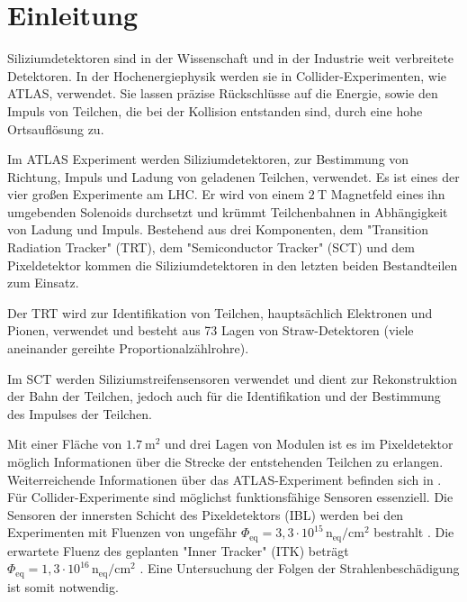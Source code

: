 \chapter{Einleitung}
Siliziumdetektoren sind in der Wissenschaft und in der Industrie weit verbreitete
Detektoren. In der Hochenergiephysik werden sie in Collider-Experimenten, wie ATLAS, verwendet.
Sie  lassen präzise Rückschlüsse auf die Energie, sowie den Impuls von Teilchen, die bei der
Kollision entstanden sind, durch eine
hohe Ortsauflösung zu.


Im ATLAS Experiment werden Siliziumdetektoren, zur Bestimmung von Richtung, Impuls
und Ladung von geladenen Teilchen, verwendet. Es ist eines der vier großen Experimente am LHC.
Er wird von einem $\SI{2}{\tesla}$ Magnetfeld eines ihn umgebenden Solenoids
durchsetzt und krümmt Teilchenbahnen in Abhängigkeit von Ladung und Impuls.
Bestehend aus drei Komponenten, dem "Transition Radiation Tracker" (TRT), dem "Semiconductor Tracker" (SCT) und
dem Pixeldetektor kommen  die
Siliziumdetektoren in den letzten beiden Bestandteilen zum Einsatz.

Der TRT wird zur Identifikation von Teilchen, hauptsächlich Elektronen und Pionen, verwendet und besteht aus 73 Lagen
von Straw-Detektoren (viele aneinander gereihte Proportionalzählrohre).

Im SCT werden Siliziumstreifensensoren verwendet und dient zur
Rekonstruktion der Bahn der Teilchen, jedoch auch für die Identifikation und der Bestimmung des Impulses der Teilchen.

Mit einer Fläche von $\SI{1.7}{\meter\squared}$ und drei Lagen von Modulen
ist es im Pixeldetektor möglich
Informationen über die Strecke der entstehenden Teilchen zu erlangen.
Weiterreichende Informationen über das ATLAS-Experiment befinden sich in \cite{ATLAS}.
Für Collider-Experimente sind möglichst funktionsfähige Sensoren essenziell.
Die Sensoren der innersten Schicht des Pixeldetektors (IBL)
werden bei den Experimenten mit Fluenzen von ungefähr $\Phi_{\mathrm{eq}} =3,3\cdot 10^{15} \, \mathrm{n_{eq}/cm^2}$ bestrahlt \cite{Capeans:1291633}.
Die erwartete Fluenz des geplanten "Inner Tracker" (ITK) beträgt
$\Phi_{\mathrm{eq}} =1,3\cdot 10^{16} \, \mathrm{n_{eq}/cm^2}$ \cite{itk}. Eine Untersuchung
der Folgen der Strahlenbeschädigung ist somit notwendig.


